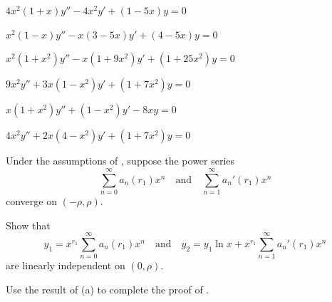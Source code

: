\begin{exerciselist}
\item\label{exer:7.6.47}$4x^2(1+x)y''-4x^2y'+(1-5x)y=0$

\item\label{exer:7.6.48}$x^2(1-x)y''-x(3-5x)y'+(4-5x)y=0$

\item\label{exer:7.6.49}$x^2(1+x^2)y''-x(1+9x^2)y'+(1+25x^2)y=0$

\item\label{exer:7.6.50}$9x^2y''+3x(1-x^2)y'+(1+7x^2)y=0$

\item\label{exer:7.6.51}$x(1+x^2)y''+(1-x^2)y'-8xy=0$

\item\label{exer:7.6.52}$4x^2y''+2x(4-x^2)y'+(1+7x^2)y=0$

\item\label{exer:7.6.53}Under the assumptions of , suppose
the power series
\[
\sum_{n=0}^\infty a_n(r_1)x^n \quad\text{and}\quad
\sum_{n=1}^\infty a_n'(r_1)x^n
\]
  converge on $(-\rho,\rho)$.
\begin{alist}
\item %
Show that
\[
y_1=x^{r_1}\sum_{n=0}^\infty a_n(r_1)x^n\quad\text{and}\quad
y_2=y_1\ln x+x^{r_1}\sum_{n=1}^\infty a_n'(r_1)x^n
\]
are linearly independent on $(0,\rho)$. 
\item %
Use the result of (a) to
complete the proof of .
\end{alist}


\end{exerciselist}
